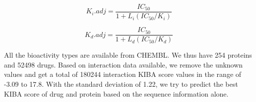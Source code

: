 \begin{equation}
K_i.{adj} = \frac{IC_{50}}{1 + L_i(IC_{50}/K_i)}
\label{eq:ki_adj}
\end{equation}

\begin{equation}
K_d.{adj} = \frac{IC_{50}}{1 + L_d(IC_{50}/K_d)}
\end{equation}

All the bioactivity types are available from CHEMBL.\cite{Gaulton2017} We thus have 254 proteins and 52498 drugs. Based on interaction data available, we remove the unknown values and get a total of 180244 interaction KIBA score values in the range of -3.09 to 17.8. With the standard deviation of 1.22, we try to predict the best KIBA score of drug and protein based on the sequence information alone.
\begin{figure}
  \centering 

\end{figure}
